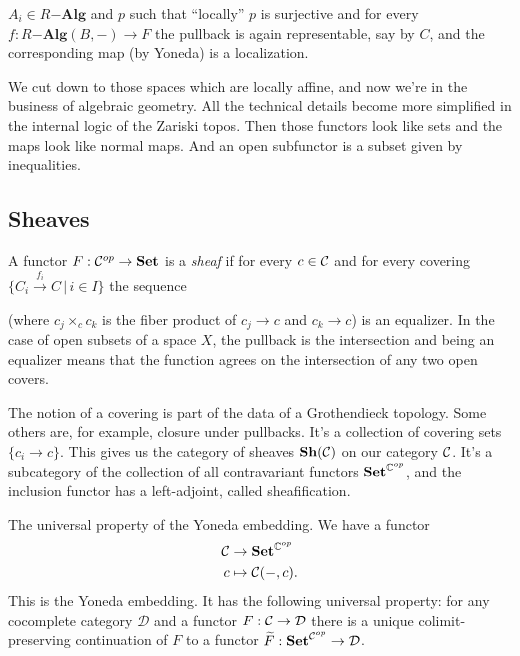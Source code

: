 \documentclass[../MH_Total.tex]{subfiles}
\begin{document}
$A_i \in R\mathbf{-Alg}$ and $p$ such that ``locally'' $p$ is surjective and for every $f: R\mathbf{-Alg}(B,-) \to F$ the pullback is again representable, say by $C$, and the corresponding map (by Yoneda) is a localization.

We cut down to those spaces which are locally affine, and now we're in the business of algebraic geometry. All the technical details become more simplified in the internal logic of the Zariski topos. Then those functors look like sets and the maps look like normal maps. And an open subfunctor is a subset given by inequalities.

\subsection{Sheaves}
A functor $F: \mathcal{C}^{op} \to \mathbf{Set}$ is a \emph{sheaf} if for every $c \in \mathcal{C}$ and for every covering $\{C_i \xrightarrow{f_i} C \,|\, i \in I\}$ the sequence
\begin{center}
	(where $c_j \times_c c_k$ is the fiber product of $c_j \to c$ and $c_k \to c$) is an equalizer. In the case of open subsets of a space $X$, the pullback is the intersection and being an equalizer means that the function agrees on the intersection of any two open covers. 
\end{center}

The notion of a covering is part of the data of a Grothendieck topology. Some others are, for example, closure under pullbacks. It's a collection of covering sets $\{c_i \to c\}$. This gives us the category of sheaves $\mathbf{Sh}(\mathcal{C})$ on our category $\mathcal{C}$. It's a subcategory of the collection of all contravariant functors $\mathbf{Set}^{\mathbb{C}^{op}}$, and the inclusion functor has a left-adjoint, called sheafification.

The universal property of the Yoneda embedding. We have a functor
\begin{align*}
	\mathcal{C} &\to \mathbf{Set}^{\mathbb{C}^{op}}\\
	c &\mapsto \mathcal{C}(-,c).
\end{align*}
This is the Yoneda embedding. It has the following universal property: for any cocomplete category $\mathcal{D}$ and a functor $F: \mathcal{C} \to \mathcal{D}$ there is a unique colimit-preserving continuation of $F$ to a functor $\widetilde{F}: \mathbf{Set}^{\mathcal{C}^{op}} \to \mathcal{D}$.
\end{document}
